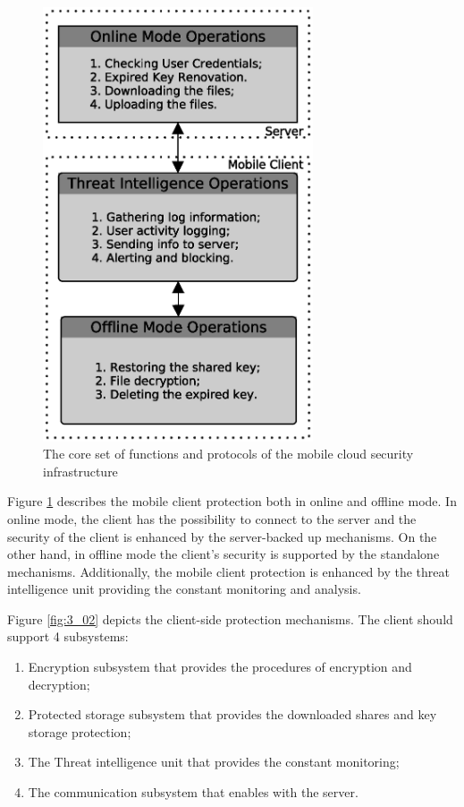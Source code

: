 \begin{figure}[h!]
	\centering
	\includegraphics[width=8cm]{figures/ch3/fig01.eps}
	\caption{The core set of functions and protocols of the mobile cloud security infrastructure}
	\label{fig:3_01}
\end{figure}

Figure \ref{fig:3_01} describes the mobile client protection both in online and offline mode. In online mode, the client has the possibility to connect to the server and the security of the client is enhanced by the server-backed up mechanisms. On the other hand, in offline mode the client’s security is supported by the standalone mechanisms. Additionally, the mobile client protection is enhanced by the threat intelligence unit providing the constant monitoring and analysis.

Figure \ref{fig:3_02} depicts the client-side protection mechanisms. The client should support 4 subsystems: 
\begin{enumerate}
	\item Encryption subsystem that provides the procedures of encryption and decryption;
	\item Protected storage subsystem that provides the downloaded shares and key storage protection;
	\item The Threat intelligence unit that provides the constant monitoring;
	\item The communication subsystem that enables with the server.
\end{enumerate}

